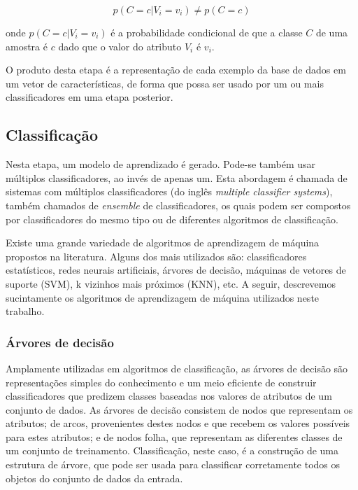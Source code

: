 \begin{equation}
	\displaystyle p(C=c|V_i=v_i) \neq p(C=c)
\end{equation}

onde $p(C=c|V_i=v_i)$ é a probabilidade condicional de que a classe $C$ de uma amostra é $c$ dado que o valor do atributo $V_i$ é $v_i$.

O produto desta etapa é a representação de cada exemplo da base de dados em um vetor de características, de forma que possa ser usado por um ou mais classificadores em uma etapa posterior.


\subsection{Classificação}\label{sec:classificacao}

Nesta etapa, um modelo de aprendizado é gerado. Pode-se também usar múltiplos classificadores, ao invés de apenas um. Esta abordagem é chamada de sistemas com múltiplos classificadores (do inglês \textit{multiple classifier systems}), também chamados de \textit{ensemble} de classificadores, os quais podem ser compostos por classificadores do mesmo tipo ou de diferentes algoritmos de classificação.

Existe uma grande variedade de algoritmos de aprendizagem de máquina propostos na literatura. Alguns dos mais utilizados são: classificadores estatísticos, redes neurais artificiais, árvores de decisão, máquinas de vetores de suporte (SVM), k vizinhos mais próximos (KNN), etc. A seguir, descrevemos sucintamente os algoritmos de aprendizagem de máquina utilizados neste trabalho.

\subsubsection*{Árvores de decisão}

Amplamente utilizadas em algoritmos de classificação, as árvores de decisão são representações simples do conhecimento e um meio eficiente de construir classificadores que predizem classes baseadas nos valores de atributos de um conjunto de dados. As árvores de decisão consistem de nodos que representam os atributos; de arcos, provenientes destes nodos e que recebem os valores possíveis para estes atributos; e de nodos folha, que representam as diferentes classes de um conjunto de treinamento. Classificação, neste caso, é a construção de uma estrutura de árvore, que pode ser usada para classificar corretamente todos os objetos do conjunto de dados da entrada.

